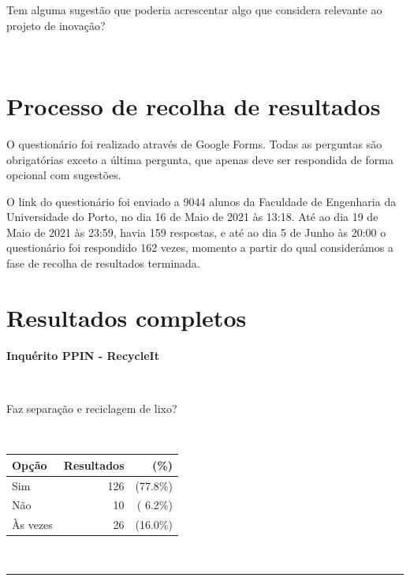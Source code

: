 \documentclass[11pt, a4paper, oneside]{book}
\begin{document}
\begin{appendices}
\begin{mdframed}[innerleftmargin=7.5mm, innerrightmargin=7.5mm, innertopmargin=7.5mm, innerbottommargin=7.5mm]
Tem alguma sugestão que poderia acrescentar algo que considera relevante ao projeto de inovação?

~

\noindent\fbox{\parbox{\linewidth - 7pt}{%
    ~
    
    ~
    
    ~
}}

\end{mdframed}

\newpage

\section{Processo de recolha de resultados}

O questionário foi realizado através de Google Forms. Todas as perguntas são obrigatórias exceto a última pergunta, que apenas deve ser respondida de forma opcional com sugestões.

O link do questionário foi enviado a 9044 alunos da Faculdade de Engenharia da Universidade do Porto, no dia 16 de Maio de 2021 às 13:18. Até ao dia 19 de Maio de 2021 às 23:59, havia 159 respostas, e até ao dia 5 de Junho às 20:00 o questionário foi respondido 162 vezes, momento a partir do qual considerámos a fase de recolha de resultados terminada.

\section{Resultados completos}

\begin{mdframed}[innerleftmargin=7.5mm, innerrightmargin=7.5mm, innertopmargin=7.5mm, innerbottommargin=7.5mm]

{\Large \textbf{Inquérito PPIN - RecycleIt}}

~

Faz separação e reciclagem de lixo?

~

\begin{tabular}{@{} l | r r @{} }
    \textbf{Opção} & \textbf{Resultados} & \textbf{(\%)} \\ \hline
    Sim      & 126 & (77.8\%) \\
    Não      &  10 & ( 6.2\%) \\
    Às vezes &  26 & (16.0\%) 
\end{tabular}

~

\rule{\linewidth}{0.5pt}\vspace{0.5em}


\end{mdframed}
\end{appendices}
\end{document}
